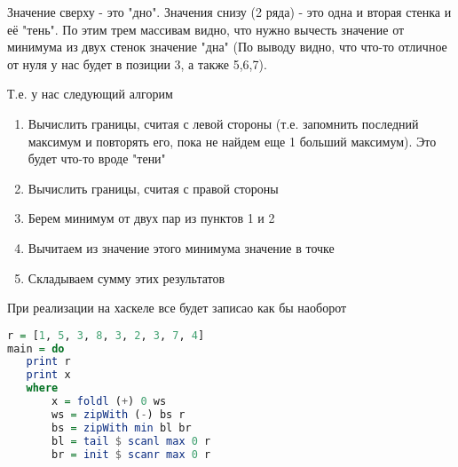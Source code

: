 \documentclass[10pt, a4paper]{article}
\begin{document}
Значение сверху - это "дно". Значения снизу (2 ряда) - это одна и вторая стенка и её "тень". По этим трем массивам видно, что нужно вычесть значение от минимума из двух стенок значение "дна" (По выводу видно, что что-то отличное от нуля у нас будет в позиции 3, а также 5,6,7).

Т.е. у нас следующий алгорим
\begin{enumerate}
	\item Вычислить границы, считая с левой стороны (т.е. запомнить последний максимум и повторять его, пока не найдем еще 1 больший максимум). Это будет что-то вроде "тени"
	\item Вычислить границы, считая с правой стороны
	\item Берем минимум от двух пар из пунктов 1 и 2
	\item Вычитаем из значение этого минимума значение в точке
	\item Складываем сумму этих результатов
\end{enumerate}

При реализации на хаскеле все будет записао как бы наоборот

\begin{lstlisting}[language=haskell]
r = [1, 5, 3, 8, 3, 2, 3, 7, 4]
main = do
   print r
   print x
   where 
       x = foldl (+) 0 ws
       ws = zipWith (-) bs r
       bs = zipWith min bl br
       bl = tail $ scanl max 0 r
       br = init $ scanr max 0 r
\end{lstlisting}
\end{document}
